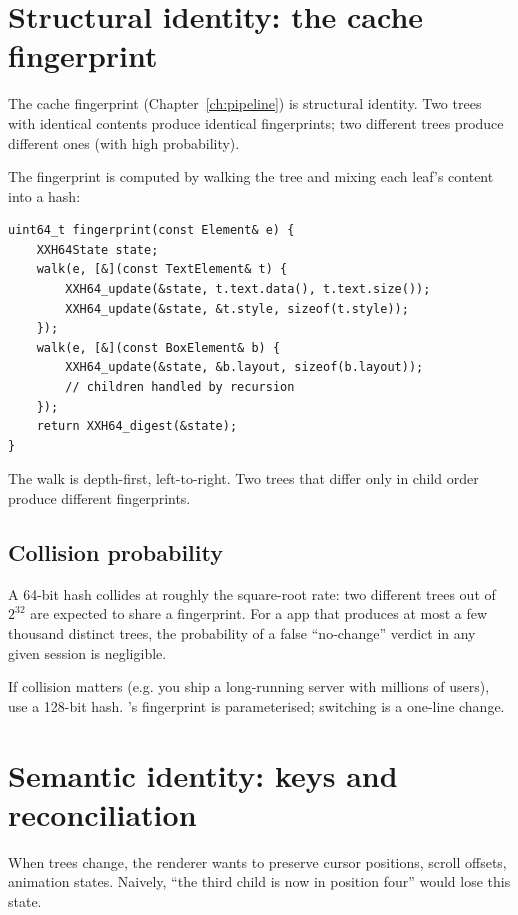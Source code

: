 \section{Structural identity: the cache fingerprint}

The cache fingerprint (Chapter~\ref{ch:pipeline}) is structural
identity. Two trees with identical contents produce identical
fingerprints; two different trees produce different ones (with
high probability).

The fingerprint is computed by walking the tree and mixing each
leaf's content into a hash:

\begin{lstlisting}
uint64_t fingerprint(const Element& e) {
    XXH64State state;
    walk(e, [&](const TextElement& t) {
        XXH64_update(&state, t.text.data(), t.text.size());
        XXH64_update(&state, &t.style, sizeof(t.style));
    });
    walk(e, [&](const BoxElement& b) {
        XXH64_update(&state, &b.layout, sizeof(b.layout));
        // children handled by recursion
    });
    return XXH64_digest(&state);
}
\end{lstlisting}

The walk is depth-first, left-to-right. Two trees that differ
only in child order produce different fingerprints.

\subsection*{Collision probability}

A 64-bit hash collides at roughly the square-root rate: two
different trees out of $2^{32}$ are expected to share a
fingerprint. For a \maya{} app that produces at most a few
thousand distinct trees, the probability of a false ``no-change''
verdict in any given session is negligible.

If collision matters (e.g. you ship a long-running server with
millions of users), use a 128-bit hash. \maya{}'s fingerprint
is parameterised; switching is a one-line change.

\section{Semantic identity: keys and reconciliation}

When trees change, the renderer wants to preserve cursor
positions, scroll offsets, animation states. Naively, ``the
third child is now in position four'' would lose this state.

